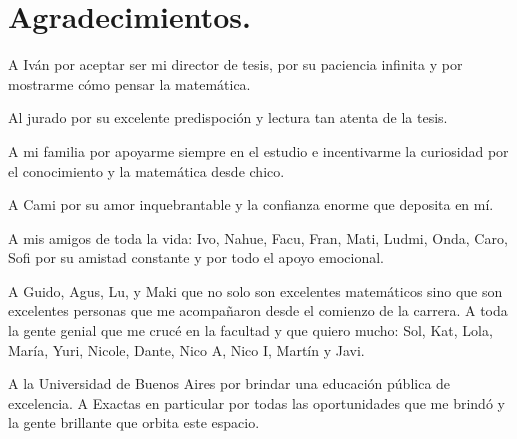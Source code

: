 \documentclass[tesis.tex]{subfiles}
\begin{document}
\chapter*{Agradecimientos.}

A Iván por aceptar ser mi director de tesis, por su paciencia infinita y por mostrarme cómo pensar la matemática.

Al jurado por su excelente predispoción y lectura tan atenta de la tesis.

A mi familia por apoyarme siempre en el estudio e incentivarme la curiosidad por el conocimiento y la matemática desde chico.

A Cami por su amor inquebrantable y la confianza enorme que deposita en mí. 

A mis amigos de toda la vida: Ivo, Nahue, Facu, Fran, Mati, Ludmi, Onda, Caro, Sofi por su amistad constante y por todo el apoyo emocional.

A Guido, Agus, Lu, y Maki que no solo son excelentes matemáticos sino que son excelentes personas que me acompañaron desde el comienzo de la carrera.
A toda la gente genial que me crucé en la facultad y que quiero mucho: Sol, Kat, Lola, María, Yuri, Nicole, Dante, Nico A, Nico I, Martín y Javi.


A la Universidad de Buenos Aires por brindar una educación pública de excelencia. 
A Exactas en particular por todas las oportunidades que me brindó y la gente brillante que orbita este espacio.
\end{document}
